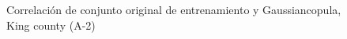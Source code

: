 \begin{figure}[H]
    \centering
    
    \caption{Correlación de conjunto original de entrenamiento y Gaussiancopula, King county (A-2)}
    \label{pairwise-king county-a-2-gaussiancopula}
\end{figure}